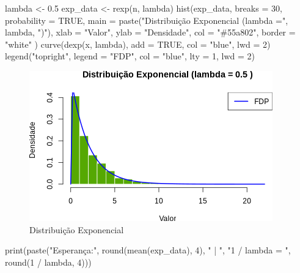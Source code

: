 \documentclass[
]{article}
\newenvironment{Shaded}{\begin{snugshade}}{\end{snugshade}}
\newcommand{\AttributeTok}[1]{\textcolor[rgb]{0.77,0.63,0.00}{#1}}
\newcommand{\ConstantTok}[1]{\textcolor[rgb]{0.00,0.00,0.00}{#1}}
\newcommand{\DecValTok}[1]{\textcolor[rgb]{0.00,0.00,0.81}{#1}}
\newcommand{\FloatTok}[1]{\textcolor[rgb]{0.00,0.00,0.81}{#1}}
\newcommand{\FunctionTok}[1]{\textcolor[rgb]{0.00,0.00,0.00}{#1}}
\newcommand{\NormalTok}[1]{#1}
\newcommand{\OtherTok}[1]{\textcolor[rgb]{0.56,0.35,0.01}{#1}}
\newcommand{\SpecialCharTok}[1]{\textcolor[rgb]{0.00,0.00,0.00}{#1}}
\newcommand{\StringTok}[1]{\textcolor[rgb]{0.31,0.60,0.02}{#1}}
\begin{document}
\begin{Shaded}
\begin{Highlighting}[]
\NormalTok{lambda }\OtherTok{\textless{}{-}} \FloatTok{0.5}
\NormalTok{exp\_data }\OtherTok{\textless{}{-}} \FunctionTok{rexp}\NormalTok{(n, lambda)}
\FunctionTok{hist}\NormalTok{(exp\_data,}
  \AttributeTok{breaks =} \DecValTok{30}\NormalTok{, }\AttributeTok{probability =} \ConstantTok{TRUE}\NormalTok{,}
  \AttributeTok{main =} \FunctionTok{paste}\NormalTok{(}\StringTok{"Distribuição Exponencial (lambda ="}\NormalTok{, lambda, }\StringTok{")"}\NormalTok{),}
  \AttributeTok{xlab =} \StringTok{"Valor"}\NormalTok{, }\AttributeTok{ylab =} \StringTok{"Densidade"}\NormalTok{,}
  \AttributeTok{col =} \StringTok{"\#55a802"}\NormalTok{, }\AttributeTok{border =} \StringTok{"white"}
\NormalTok{)}
\FunctionTok{curve}\NormalTok{(}\FunctionTok{dexp}\NormalTok{(x, lambda), }\AttributeTok{add =} \ConstantTok{TRUE}\NormalTok{, }\AttributeTok{col =} \StringTok{"blue"}\NormalTok{, }\AttributeTok{lwd =} \DecValTok{2}\NormalTok{)}
\FunctionTok{legend}\NormalTok{(}\StringTok{"topright"}\NormalTok{, }\AttributeTok{legend =} \StringTok{"FDP"}\NormalTok{, }\AttributeTok{col =} \StringTok{"blue"}\NormalTok{, }\AttributeTok{lty =} \DecValTok{1}\NormalTok{, }\AttributeTok{lwd =} \DecValTok{2}\NormalTok{)}
\end{Highlighting}
\end{Shaded}

\begin{figure}

{\centering \includegraphics{7_activity_files/figure-latex/exp-plot-1} 

}

\caption{Distribuição Exponencial}\label{fig:exp-plot}
\end{figure}

\begin{Shaded}
\begin{Highlighting}[]
\FunctionTok{print}\NormalTok{(}\FunctionTok{paste}\NormalTok{(}\StringTok{"Esperança:"}\NormalTok{, }\FunctionTok{round}\NormalTok{(}\FunctionTok{mean}\NormalTok{(exp\_data), }\DecValTok{4}\NormalTok{), }\StringTok{" | "}\NormalTok{, }\StringTok{"1 / lambda = "}\NormalTok{, }\FunctionTok{round}\NormalTok{(}\DecValTok{1} \SpecialCharTok{/}\NormalTok{ lambda, }\DecValTok{4}\NormalTok{)))}
\end{Highlighting}
\end{Shaded}
\end{document}
